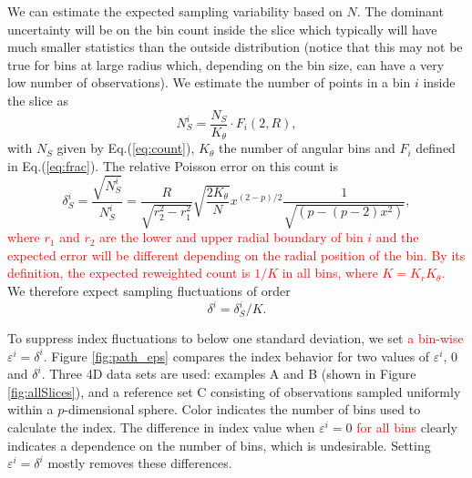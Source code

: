 \documentclass[]{interact}
\theoremstyle{plain}%
\theoremstyle{definition}
\theoremstyle{remark}
\begin{document}
We can estimate the expected sampling variability based on \(N\). The
dominant uncertainty will be on the bin count inside the slice which
typically will have much smaller statistics than the outside
distribution (notice that this may not be true for bins at large radius
which, depending on the bin size, can have a very low number of
observations). We estimate the number of points in a bin \(i\) inside
the slice as \begin{equation}
N_S^i = \frac{N_S}{K_{\theta}} \cdot F_i(2, R),
\end{equation} with \(N_S\) given by Eq.(\ref{eq:count}), \(K_{\theta}\)
the number of angular bins and \(F_i\) defined in Eq.(\ref{eq:frac}).
The relative Poisson error on this count is \begin{equation}
\delta_S^i = \frac{\sqrt{N_S^i}}{N_S^i} = 
\frac{R}{\sqrt{r_2^2 - r_1^2}} \sqrt{\frac{2 K_{\theta}}{N}} x^{(2-p)/2}
\frac{1}{\sqrt{\left(p - (p-2) x^{2}\right)}}, 
\end{equation}
\textcolor{red}{where $r_1$ and $r_2$ are the lower and upper radial boundary of bin $i$ and the expected error will be different depending on the radial position of the bin. By its definition, the expected reweighted count is $1/K$ in all bins, where $K=K_r K_{\theta}$.}
We therefore expect sampling fluctuations of order \begin{equation}
\delta^i = \delta_S^i / K. 
\label{eq:eps}
\end{equation}

To suppress index fluctuations to below one standard deviation, we set
\textcolor{red}{a bin-wise} \(\varepsilon^i = \delta^i\). Figure
\ref{fig:path_eps} compares the index behavior for two values of
\(\varepsilon^i\), \(0\) and \(\delta^i\). Three 4D data sets are used:
examples A and B (shown in Figure \ref{fig:allSlices}), and a reference
set C consisting of observations sampled uniformly within a
\(p\)-dimensional sphere. Color indicates the number of bins used to
calculate the index. The difference in index value when
\(\varepsilon^i=0\) \textcolor{red}{for all bins} clearly indicates a
dependence on the number of bins, which is undesirable. Setting
\(\varepsilon^i = \delta^i\) mostly removes these differences.
\end{document}

